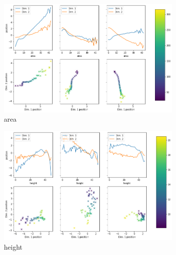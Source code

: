\begin{figure}[H]
    \centering
    \begin{subfigure}{.48\textwidth}
        \includegraphics[width=\textwidth]{images/latent_space_traversals/vlae_gan_mnist_morpho_latent_space_values_area.png}
        \caption{area}
    \end{subfigure}
    \hfill
    \begin{subfigure}{.48\textwidth}
        \includegraphics[width=\textwidth]{images/latent_space_traversals/vlae_gan_mnist_morpho_latent_space_values_height.png}
        \caption{height}
    \end{subfigure}
    \begin{subfigure}{.48\textwidth}

\end{subfigure}
\end{figure}
